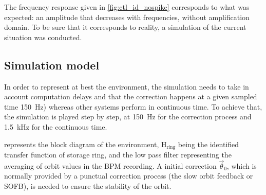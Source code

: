 The frequency response given in \cref{fig:ctl_id_nospike} corresponds to what was expected: an amplitude that decreases with frequencies, without amplification domain. To be sure that it corresponds to reality, a simulation of the current situation was conducted.

\subsection{Simulation model}
\label{sec:correction_simulation}

In order to represent at best the environment, the simulation needs to take in account computation delays and that the correction happens at a given sampled time \SI{150}{\hertz}) whereas other systems perform in continuous time. To achieve that, the simulation is played step by step, at \SI{150}{\hertz} for the correction process and \SI{1.5}{\kilo\hertz} for the continuous time.

 represents the block diagram of the environment, $\text{H}_\text{ring}$ being the identified transfer function of storage ring, and the low pass filter representing the averaging of orbit values in the BPM recording. A initial correction $\vec{\theta}_0$, which is normally provided by a punctual correction process (the slow orbit feedback or SOFB), is needed to ensure the stability of the orbit.

